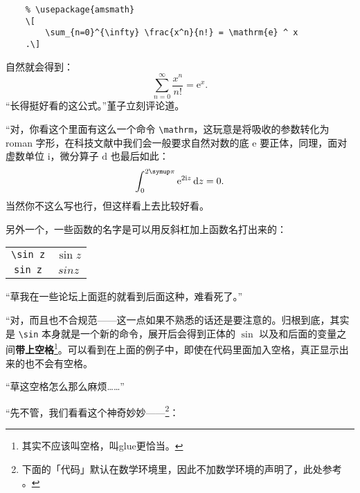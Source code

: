 \begin{lstlisting}
    % \usepackage{amsmath}
    \[
        \sum_{n=0}^{\infty} \frac{x^n}{n!} = \mathrm{e} ^ x
    .\]
\end{lstlisting}

自然就会得到：
\[
    \sum_{n=0}^{\infty} \frac{x^n}{n!} = \mathrm{e} ^ x
    .\]
“长得挺好看的这公式。”堇子立刻评论道。

“对，你看这个里面有这么一个命令 \verb"\mathrm"，这玩意是将吸收的参数转化为 roman 字形，在科技文献中我们会一般要求自然对数的底 $\mathrm{e}$ 要正体，同理，面对虚数单位 $\mathrm{i}$，微分算子 $\mathrm{d}$ 也最后如此：
\[
    \int_0^{2\symup\pi } \mathrm{e} ^ {2 \mathrm{i} z } \,\mathrm{d}z = 0
    .\]
当然你不这么写也行，但这样看上去比较好看。

另外一个，一些函数的名字是可以用反斜杠加上函数名打出来的：

\begin{center}
    \begin{tabular}{cc}
        \verb"\sin z" & $\sin z$ \\
        \verb"sin z"  & $sin z$  \\
    \end{tabular}
\end{center}

“草我在一些论坛上面逛的就看到后面这种，难看死了。”

“对，而且也不合规范——这一点如果不熟悉的话还是要注意的。归根到底，其实是 \verb"\sin" 本身就是一个新的命令，展开后会得到正体的 $\sin $ 以及和后面的变量之间\textbf{带上空格}\footnote{其实不应该叫空格，叫glue更恰当。}。可以看到在上面的例子中，即使在代码里面加入空格，真正显示出来的也不会有空格。

“草这空格怎么那么麻烦……”

“先不管，我们看看这个神奇妙妙——\footnote{下面的「代码」默认在数学环境里，因此不加数学环境的声明了，此处参考 \textcite[Symbols defined by unicode-math]{WillRobertson} 。}：

